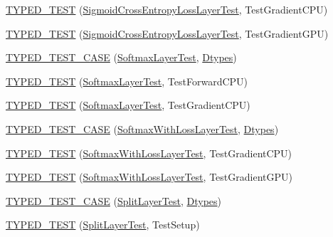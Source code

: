 \begin{DoxyCompactItemize}
\item 
\hyperlink{namespacecaffe_a356181f06c342e75ee29c952ce0c5f3c}{T\+Y\+P\+E\+D\+\_\+\+T\+E\+S\+T} (\hyperlink{classcaffe_1_1_sigmoid_cross_entropy_loss_layer_test}{Sigmoid\+Cross\+Entropy\+Loss\+Layer\+Test}, Test\+Gradient\+C\+P\+U)
\item 
\hyperlink{namespacecaffe_ab8272beca892e73403ade0ea90c44a61}{T\+Y\+P\+E\+D\+\_\+\+T\+E\+S\+T} (\hyperlink{classcaffe_1_1_sigmoid_cross_entropy_loss_layer_test}{Sigmoid\+Cross\+Entropy\+Loss\+Layer\+Test}, Test\+Gradient\+G\+P\+U)
\item 
\hyperlink{namespacecaffe_a2e3da2b0f1ac8557533a651c1e44ee49}{T\+Y\+P\+E\+D\+\_\+\+T\+E\+S\+T\+\_\+\+C\+A\+S\+E} (\hyperlink{classcaffe_1_1_softmax_layer_test}{Softmax\+Layer\+Test}, \hyperlink{namespacecaffe_a131dc2be50f2f10e18450da61cde6b57}{Dtypes})
\item 
\hyperlink{namespacecaffe_af415617059cd1f56114566298e2d003d}{T\+Y\+P\+E\+D\+\_\+\+T\+E\+S\+T} (\hyperlink{classcaffe_1_1_softmax_layer_test}{Softmax\+Layer\+Test}, Test\+Forward\+C\+P\+U)
\item 
\hyperlink{namespacecaffe_aab6808133ed1cbe9a02af4fbb0af9bbb}{T\+Y\+P\+E\+D\+\_\+\+T\+E\+S\+T} (\hyperlink{classcaffe_1_1_softmax_layer_test}{Softmax\+Layer\+Test}, Test\+Gradient\+C\+P\+U)
\item 
\hyperlink{namespacecaffe_ae23b8e67e3f04c39e1807f63dea4e827}{T\+Y\+P\+E\+D\+\_\+\+T\+E\+S\+T\+\_\+\+C\+A\+S\+E} (\hyperlink{classcaffe_1_1_softmax_with_loss_layer_test}{Softmax\+With\+Loss\+Layer\+Test}, \hyperlink{namespacecaffe_a131dc2be50f2f10e18450da61cde6b57}{Dtypes})
\item 
\hyperlink{namespacecaffe_af5844670e59c921efd001d0a009f1acf}{T\+Y\+P\+E\+D\+\_\+\+T\+E\+S\+T} (\hyperlink{classcaffe_1_1_softmax_with_loss_layer_test}{Softmax\+With\+Loss\+Layer\+Test}, Test\+Gradient\+C\+P\+U)
\item 
\hyperlink{namespacecaffe_a2b169d7fe71817bf5f15ef05c86f75a6}{T\+Y\+P\+E\+D\+\_\+\+T\+E\+S\+T} (\hyperlink{classcaffe_1_1_softmax_with_loss_layer_test}{Softmax\+With\+Loss\+Layer\+Test}, Test\+Gradient\+G\+P\+U)
\item 
\hyperlink{namespacecaffe_a6c39e478577aad54a91f57372cae171d}{T\+Y\+P\+E\+D\+\_\+\+T\+E\+S\+T\+\_\+\+C\+A\+S\+E} (\hyperlink{classcaffe_1_1_split_layer_test}{Split\+Layer\+Test}, \hyperlink{namespacecaffe_a131dc2be50f2f10e18450da61cde6b57}{Dtypes})
\item 
\hyperlink{namespacecaffe_a68257f79783eb5355a4509c37884613a}{T\+Y\+P\+E\+D\+\_\+\+T\+E\+S\+T} (\hyperlink{classcaffe_1_1_split_layer_test}{Split\+Layer\+Test}, Test\+Setup)

\end{DoxyCompactItemize}
